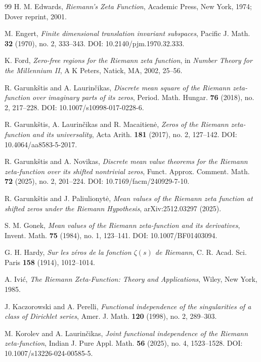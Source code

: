 \documentclass[11pt]{amsart}
\numberwithin{equation}{section}
\begin{document}
\begin{thebibliography}{99}
H. M. Edwards,
\emph{Riemann's Zeta Function},
Academic Press, New York, 1974; Dover reprint, 2001.

M. Engert,
\emph{Finite dimensional translation invariant subspaces},
Pacific J. Math. \textbf{32} (1970), no. 2, 333--343.
DOI: 10.2140/pjm.1970.32.333.

K. Ford,
\emph{Zero-free regions for the Riemann zeta function},
in \emph{Number Theory for the Millennium II},
A K Peters, Natick, MA, 2002, 25--56.

R. Garunk\v{s}tis and A. Laurin\v{c}ikas,
\emph{Discrete mean square of the Riemann zeta-function over imaginary parts of its zeros},
Period. Math. Hungar. \textbf{76} (2018), no. 2, 217--228.
DOI: 10.1007/s10998-017-0228-6.

R. Garunk\v{s}tis, A. Laurin\v{c}ikas and R. Macaitien\.e,
\emph{Zeros of the Riemann zeta-function and its universality},
Acta Arith. \textbf{181} (2017), no. 2, 127--142.
DOI: 10.4064/aa8583-5-2017.

R. Garunk\v{s}tis and A. Novikas,
\emph{Discrete mean value theorems for the Riemann zeta-function over its shifted nontrivial zeros},
Funct. Approx. Comment. Math. \textbf{72} (2025), no. 2, 201--224.
DOI: 10.7169/facm/240929-7-10.

R. Garunk\v{s}tis and J. Paliulionyt\.e,
\emph{Mean values of the Riemann zeta function at shifted zeros under the Riemann Hypothesis},
arXiv:2512.03297 (2025).

S. M. Gonek,
\emph{Mean values of the Riemann zeta-function and its derivatives},
Invent. Math. \textbf{75} (1984), no. 1, 123--141.
DOI: 10.1007/BF01403094.

G. H. Hardy,
\emph{Sur les z\'eros de la fonction $\zeta(s)$ de Riemann},
C. R. Acad. Sci. Paris \textbf{158} (1914), 1012--1014.

A. Ivi\'c,
\emph{The Riemann Zeta-Function: Theory and Applications},
Wiley, New York, 1985.

J. Kaczorowski and A. Perelli,
\emph{Functional independence of the singularities of a class of Dirichlet series},
Amer. J. Math. \textbf{120} (1998), no. 2, 289--303.

M. Korolev and A. Laurin\v{c}ikas,
\emph{Joint functional independence of the Riemann zeta-function},
Indian J. Pure Appl. Math. \textbf{56} (2025), no. 4, 1523--1528.
DOI: 10.1007/s13226-024-00585-5.


\end{thebibliography}
\end{document}
